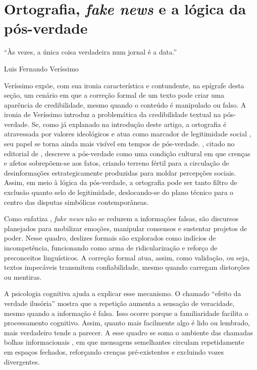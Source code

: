 \documentclass[portuguese]{textolivre}
\begin{document}
\section{Ortografia, \textit{fake news} e a lógica da pós-verdade}\label{sec-conduta}

\epigraph{``Às vezes, a única coisa verdadeira num jornal é a data.''}{Luis Fernando Veríssimo}

Veríssimo expõe, com sua ironia característica e contundente, na epígrafe desta seção, um cenário em que a correção formal de um texto pode criar uma aparência de credibilidade, mesmo quando o conteúdo é manipulado ou falso. A ironia de Veríssimo introduz a problemática da credibilidade textual na pós-verdade. Se, como já explanado na introdução deste artigo, a ortografia é atravessada por valores ideológicos e atua como marcador de legitimidade social \textcite{volochinov2017marxismo,bourdieu1989poder,bourdieu1991language,fairclough1989language,fairclough2001discurso}, seu papel se torna ainda mais visível em tempos de pós-verdade. \textcite{tesich1992government}, citado no editorial de \textcite{siebert2020posverdade}, descreve a pós-verdade como uma condição cultural em que crenças e afetos sobrepõem-se aos fatos, criando terreno fértil para a circulação de desinformações estrategicamente produzidas para moldar percepções sociais. Assim, em meio à lógica da pós-verdade, a ortografia pode ser tanto filtro de exclusão quanto selo de legitimidade, deslocando-se do plano técnico para o centro das disputas simbólicas contemporâneas.

Como enfatiza \textcite{souza2019fakenews}, \textit{fake news} não se reduzem a informações falsas, são discursos planejados para mobilizar emoções, manipular consensos e sustentar projetos de poder. Nesse quadro, deslizes formais são explorados como indícios de incompetência, funcionando como arma de ridicularização e reforço de preconceitos linguísticos. A correção formal atua, assim, como validação, ou seja, textos impecáveis transmitem confiabilidade, mesmo quando carregam distorções ou mentiras.

A psicologia cognitiva ajuda a explicar esse mecanismo. O chamado “efeito da verdade ilusória” \cite{fazio2015illusorytruth} mostra que a repetição aumenta a sensação de veracidade, mesmo quando a informação é falsa. Isso ocorre porque a familiaridade facilita o processamento cognitivo. Assim, quanto mais facilmente algo é lido ou lembrado, mais verdadeiro tende a parecer. A esse quadro se soma o ambiente das chamadas bolhas informacionais \cite{silva2025bolhas}, em que mensagens semelhantes circulam repetidamente em espaços fechados, reforçando crenças pré-existentes e excluindo vozes divergentes.
\end{document}
